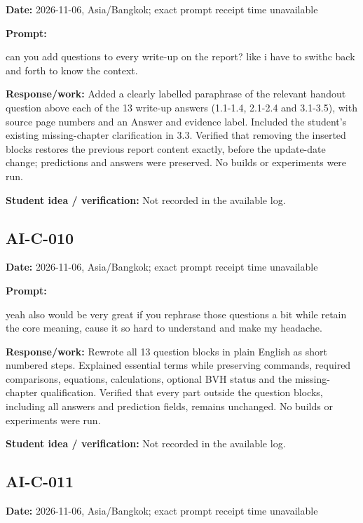 \documentclass[11pt,a4paper]{article}
\begin{document}
\noindent\textbf{Date:} 2026-11-06, Asia/\allowbreak{}Bangkok; exact prompt receipt time unavailable\par
\noindent\textbf{Prompt:}
\begin{prompt}
can you add questions to every write-up on the report? like i have to swithc back and
forth to know the context.
\end{prompt}
\noindent\textbf{Response/work:} Added a clearly labelled paraphrase of the relevant handout question above each of the 13 write-up answers (1.1-1.4, 2.1-2.4 and 3.1-3.5), with source page numbers and an Answer and evidence label. Included the student's existing missing-chapter clarification in 3.3. Verified that removing the inserted blocks restores the previous report content exactly, before the update-date change; predictions and answers were preserved. No builds or experiments were run.\par
\noindent\textbf{Student idea / verification:} Not recorded in the available log.\par\medskip
{}\subsection*{AI-C-010}
\noindent\textbf{Date:} 2026-11-06, Asia/\allowbreak{}Bangkok; exact prompt receipt time unavailable\par
\noindent\textbf{Prompt:}
\begin{prompt}
yeah also would be very great if you rephrase those questions a bit while retain the core
 meaning, cause it so hard to understand and make my headache.
\end{prompt}
\noindent\textbf{Response/work:} Rewrote all 13 question blocks in plain English as short numbered steps. Explained essential terms while preserving commands, required comparisons, equations, calculations, optional BVH status and the missing-chapter qualification. Verified that every part outside the question blocks, including all answers and prediction fields, remains unchanged. No builds or experiments were run.\par
\noindent\textbf{Student idea / verification:} Not recorded in the available log.\par\medskip
{}\subsection*{AI-C-011}
\noindent\textbf{Date:} 2026-11-06, Asia/\allowbreak{}Bangkok; exact prompt receipt time unavailable\par
\end{document}

